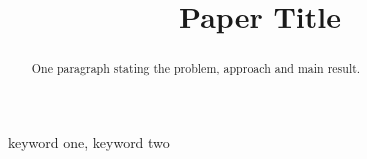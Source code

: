 \documentclass[conference]{IEEEtran}
\begin{document}
\title{Paper Title}
\author{
}
\maketitle
\begin{abstract}
One paragraph stating the problem, approach and main result.
\end{abstract}
\begin{IEEEkeywords}
keyword one, keyword two
\end{IEEEkeywords}




\end{document}
